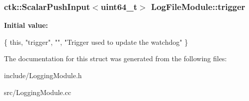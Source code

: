 \subsubsection[{\texorpdfstring{trigger}{trigger}}]{\setlength{\rightskip}{0pt plus 5cm}ctk\+::\+Scalar\+Push\+Input$<$uint64\+\_\+t$>$ Log\+File\+Module\+::trigger}\hypertarget{structLogFileModule_a0d769ef594c042748d0233a6b3e31435}{}\label{structLogFileModule_a0d769ef594c042748d0233a6b3e31435}
{\bfseries Initial value\+:}
\begin{DoxyCode}
\{ \textcolor{keyword}{this}, \textcolor{stringliteral}{"trigger"}, \textcolor{stringliteral}{""},
    \textcolor{stringliteral}{"Trigger used to update the watchdog"} \}
\end{DoxyCode}


The documentation for this struct was generated from the following files\+:\begin{DoxyCompactItemize}
\item 
include/Logging\+Module.\+h\item 
src/Logging\+Module.\+cc\end{DoxyCompactItemize}
